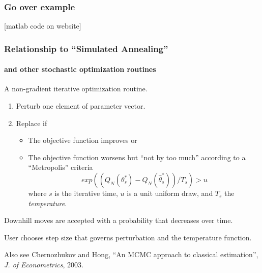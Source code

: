 \documentclass[11pt, aspectratio=169]{beamer}
\newcommand{\Skip}{\vspace{1em}}
\begin{document}
\begin{frame}[c]\frametitle{Go over example}
    
[matlab code on website]

\end{frame}


\begin{frame}[c]\frametitle{Relationship to ``Simulated Annealing''}
\framesubtitle{and other stochastic optimization routines}    

A non-gradient iterative optimization routine. 

\begin{enumerate}
  \item Perturb one element of parameter vector.
  \item Replace if 
  \begin{itemize}
     \item The objective function improves or
     \item The objective function worsens but ``not by too much'' according to a ``Metropolis'' criteria
     $$ exp((Q_N(\theta^*_s) - Q_N(\hat{\theta}^*_s))/T_s) > u$$
     where $s$ is the iterative time, $u$ is a unit uniform draw, and $T_s$ the \emph{temperature}.
   \end{itemize} 
\end{enumerate}

\Skip
Downhill moves are accepted with a probability that decreases over time. 

\Skip
User chooses step size that governs perturbation and the temperature function. 

\Skip
Also see Chernozhukov and Hong, ``An MCMC approach to classical estimation'', \emph{J. of Econometrics}, 2003. 

\end{frame}
\end{document}
